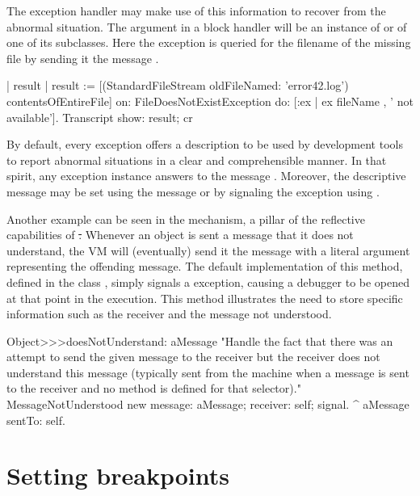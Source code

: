 \documentclass[a4paper,10pt,twoside]{book}
\begin{document}
The exception handler may make use of this information to recover from the abnormal situation. The argument  in a block handler \ct{[:ex | ...]} will be an instance of  or of one of its subclasses. Here the exception is queried for the filename of the missing file by sending it the message .

\begin{code}{}
| result |
result := [(StandardFileStream oldFileNamed: 'error42.log') contentsOfEntireFile]
	on: FileDoesNotExistException
	do: [:ex | ex fileName , ' not available'].
Transcript show: result; cr
\end{code}

By default, every exception offers a description to be used by development tools to report abnormal situations in a clear and comprehensible manner. In that spirit, any exception instance answers to the message . Moreover, the descriptive message may be set  using the message  or by signaling the exception using .

Another example can be seen in the  mechanism, a pillar of the reflective capabilities of \st. Whenever an object is sent a message that it does not understand, the VM will (eventually) send it the message  with a literal argument representing the offending message. The default implementation of this method, defined in the class , simply signals a  exception, causing a debugger to be opened at that point in the execution.
This method illustrates the need to store specific information such as the receiver and the message not understood.

\begin{code}{}
Object>>>doesNotUnderstand: aMessage 
	 "Handle the fact that there was an attempt to send the given message to the receiver but the receiver does not understand this message (typically sent from the machine when a message is sent to the receiver and no method is defined for that selector)."
	MessageNotUnderstood new 
		message: aMessage;
		receiver: self;
		signal.
	^ aMessage sentTo: self.
\end{code}

\section{Setting breakpoints}
\end{document}
